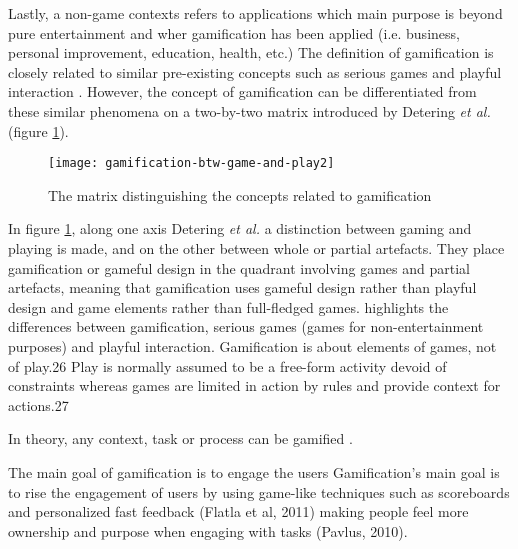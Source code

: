 Lastly, a non-game contexts refers to applications which main purpose is beyond pure entertainment and wher gamification has been applied (i.e. business, personal improvement, education, health, etc.)
\cite{deterding2011situated}
The definition of gamification is closely related to similar pre-existing concepts such as serious games and playful interaction \cite{deterding2011game}. However, the concept of gamification can be differentiated from these similar phenomena on a two-by-two matrix introduced by Detering \textit{et al.}(figure \ref{fig:mesh1}). 

\begin{figure}[h]
    \centering
    \texttt{[image: gamification-btw-game-and-play2]}
    \caption{The matrix distinguishing the concepts related to gamification}
    \label{fig:mesh1}
\end{figure}
 
In figure \ref{fig:mesh1}, along one axis Detering \textit{et al.} a distinction between gaming and playing is made, and on the other between whole or partial artefacts. They place gamification or gameful design in the quadrant involving games and partial artefacts, meaning that gamification uses gameful design rather than playful design and game elements rather than full-fledged games. 
 highlights the differences between gamification, serious games (games
for non-entertainment purposes) and playful interaction. Gamification is about
elements of games, not of play.26 Play is normally assumed to be a free-form
activity devoid of constraints whereas games are limited in action by rules and
provide context for actions.27 
 
 
% 

In theory, any context, task or process can be gamified \cite{muntean2011raising}. %

The main goal of gamification is to engage the users 
Gamification’s main goal is to rise the engagement of users by using game-like techniques such as
scoreboards and personalized fast feedback (Flatla et al, 2011) making people feel more ownership
and purpose when engaging with tasks (Pavlus, 2010). 
\cite{burke2016gamify}

